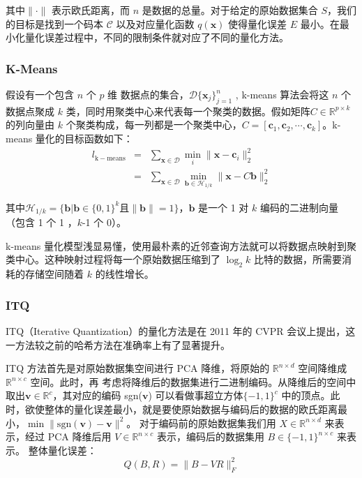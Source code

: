 其中$\lVert \cdot \rVert$ 表示欧氏距离，而 $n$ 是数据的总量。对于给定的原始数据集合 $S$，我们的目标是找到一个码本 $\mathcal{C}$ 以及对应量化函数 $q(\mathbf{x})$ 使得量化误差 $E$ 最小。在最小化量化误差过程中，不同的限制条件就对应了不同的量化方法。
\subsubsection{K-Means}
假设有一个包含 $n$ 个 $p$ 维 数据点的集合，$\mathcal{D}\{\mathbf{x}_j\}_{j=1}^n$ , k-means 算法会将这 $n$ 个数据点聚成 $k$ 类，同时用聚类中心来代表每一个聚类的数据。假如矩阵$C \in \mathbb{R}^{p\times k}$的列向量由 $k$ 个聚类构成，每一列都是一个聚类中心，$C=[\mathbf{c}_1,\mathbf{c}_2,\cdots, \mathbf{c}_k]$。k-means 量化的目标函数如下：
\begin{eqnarray}
\mathit{l}_\mathrm{k-means} &=&\sum_{\mathbf{x}\in\mathcal{D}}\min_{i}\lVert \mathbf{x} - \mathbf{c}_i \rVert _2^2 \\
                   &=&\sum_{\mathbf{x}\in\mathcal{D}}\min_{\mathbf{b}\in\mathcal{H}_{1/k}}\lVert \mathbf{x} - C\mathbf{b} \rVert _2^2
\end{eqnarray}

其中$\mathcal{H}_{1/k} = \{\mathbf{b}|\mathbf{b}\in\{0,1\}^k$且$\lVert\mathbf{b}\rVert=1\}$，$\mathbf{b}$ 是一个 1 对 $k$ 编码的二进制向量（包含 1 个 1 ，$k$-1 个 0）。

k-means 量化模型浅显易懂，使用最朴素的近邻查询方法就可以将数据点映射到聚类中心。这种映射过程将每一个原始数据压缩到了 $\log_2k$ 比特的数据，所需要消耗的存储空间随着 $k$ 的线性增长。
\subsubsection{ITQ}
ITQ（Iterative Quantization）\cite{YunchaoGong:2011:IQP:2191740.2191779}的量化方法是在 2011 年的 CVPR 会议上提出，这一方法较之前的哈希方法在准确率上有了显著提升。

ITQ 方法首先是对原始数据集空间进行 PCA 降维，将原始的 $\mathbb{R}^{n\times d}$ 空间降维成 $\mathbb{R}^{n\times c}$ 空间。此时，再
考虑将降维后的数据集进行二进制编码。从降维后的空间中取出$\mathbf{v}\in \mathbb{R}^{c}$，其对应的编码 sgn($\mathbf{v}$) 可以看做事超立方体$\{-1,1\}^c$
中的顶点。此时，欲使整体的量化误差最小，就是要使原始数据与编码后的数据的欧氏距离最小，$\min{\lVert \mathrm{sgn}(\mathbf{v})-\mathbf{v}\rVert ^2}$。
对于编码前的原始数据集我们用 $X \in \mathbb{R}^{n\times d}$ 来表示，经过 PCA 降维后用 $V \in \mathbb{R}^{n\times c}$ 表示，编码后的数据集用 $B \in \{-1,1\}^{n\times c}$ 来表示。
整体量化误差：
\begin{equation}
Q(B, R) = \lVert B - VR \rVert_F ^2
\end{equation}

